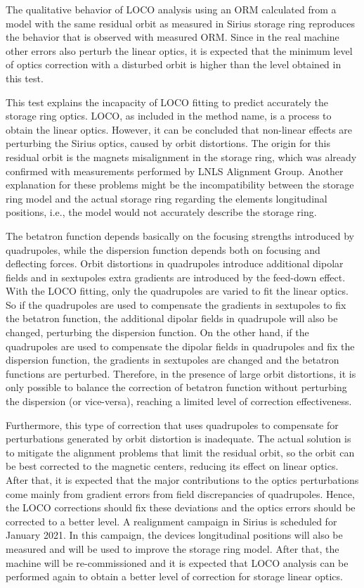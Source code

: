 The qualitative behavior of LOCO analysis using an ORM calculated from a model with the same residual orbit as measured in Sirius storage ring reproduces the behavior that is observed with measured ORM. Since in the real machine other errors also perturb the linear optics, it is expected that the minimum level of optics correction with a disturbed orbit is higher than the level obtained in this test. 

This test explains the incapacity of LOCO fitting to predict accurately the storage ring optics. LOCO, as included in the method name, is a process to obtain the linear optics. However, it can be concluded that non-linear effects are perturbing the Sirius optics, caused by orbit distortions. The origin for this residual orbit is the magnets misalignment in the storage ring, which was already confirmed with measurements performed by LNLS Alignment Group. Another explanation for these problems might be the incompatibility between the storage ring model and the actual storage ring regarding the elements longitudinal positions, i.e., the model would not accurately describe the storage ring. 

The betatron function depends basically on the focusing strengths introduced by quadrupoles, while the dispersion function depends both on focusing and deflecting forces. Orbit distortions in quadrupoles introduce additional dipolar fields and in sextupoles extra gradients are introduced by the feed-down effect. With the LOCO fitting, only the quadrupoles are varied to fit the linear optics. So if the quadrupoles are used to compensate the gradients in sextupoles to fix the betatron function, the additional dipolar fields in quadrupole will also be changed, perturbing the dispersion function. On the other hand, if the quadrupoles are used to compensate the dipolar fields in quadrupoles and fix the dispersion function, the gradients in sextupoles are changed and the betatron functions are perturbed. Therefore, in the presence of large orbit distortions, it is only possible to balance the correction of betatron function without perturbing the dispersion (or vice-versa), reaching a limited level of correction effectiveness.

Furthermore, this type of correction that uses quadrupoles to compensate for perturbations generated by orbit distortion is inadequate. The actual solution is to mitigate the alignment problems that limit the residual orbit, so the orbit can be best corrected to the magnetic centers, reducing its effect on linear optics. After that, it is expected that the major contributions to the optics perturbations come mainly from gradient errors from field discrepancies of quadrupoles. Hence, the LOCO corrections should fix these deviations and the optics errors should be corrected to a better level. A realignment campaign in Sirius is scheduled for January 2021. In this campaign, the devices longitudinal positions will also be measured and will be used to improve the storage ring model. After that, the machine will be re-commissioned and it is expected that LOCO analysis can be performed again to obtain a better level of correction for storage linear optics.
